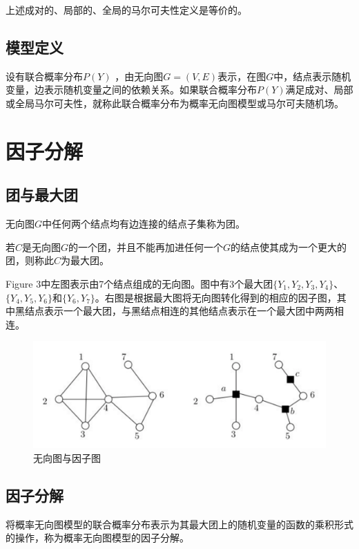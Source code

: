 \documentclass[12pt]{report}
\begin{document}
			上述成对的、局部的、全局的马尔可夫性定义是等价的。
			
		\subsection{模型定义}
			
			设有联合概率分布$P(Y)$ ，由无向图$G=(V,E)$表示，在图$G$中，结点表示随机变量，边表示随机变量之间的依赖关系。如果联合概率分布$P(Y)$满足成对、局部或全局马尔可夫性，就称此联合概率分布为概率无向图模型或马尔可夫随机场。
			
	\section{因子分解}
	
		\subsection{团与最大团}
		
			无向图$G$中任何两个结点均有边连接的结点子集称为团。
		
			若$C$是无向图$G$的一个团，并且不能再加进任何一个$G$的结点使其成为一个更大的团，则称此$C$为最大团。
	
			Figure 3中左图表示由7个结点组成的无向图。图中有3个最大团$\{Y_1,Y_2,Y_3,Y_4\}$、$\{Y_4,Y_5,Y_6\}$和$\{Y_6,Y_7\}$。右图是根据最大图将无向图转化得到的相应的因子图，其中黑结点表示一个最大团，与黑结点相连的其他结点表示在一个最大团中两两相连。
			
			\begin{figure}[H]
				\centering
				\includegraphics[scale=0.6]{img/3.png}
				\caption{无向图与因子图}
				\label{img}
			\end{figure}
		
		\subsection{因子分解}
		
			将概率无向图模型的联合概率分布表示为其最大团上的随机变量的函数的乘积形式的操作，称为概率无向图模型的因子分解。
			
\end{document}
